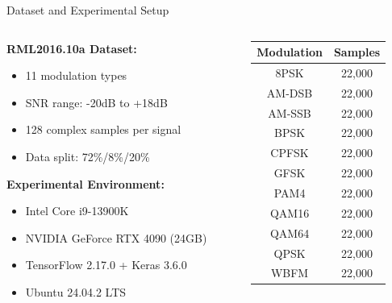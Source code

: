 \documentclass[aspectratio=169]{beamer}
\begin{document}
\begin{frame}{Dataset and Experimental Setup}
\begin{columns}
\begin{column}{0.6\textwidth}
\textbf{RML2016.10a Dataset:}
\begin{itemize}
\item 11 modulation types
\item SNR range: -20dB to +18dB
\item 128 complex samples per signal
\item Data split: 72\%/8\%/20\%
\end{itemize}

\textbf{Experimental Environment:}
\begin{itemize}
\item Intel Core i9-13900K
\item NVIDIA GeForce RTX 4090 (24GB)
\item TensorFlow 2.17.0 + Keras 3.6.0
\item Ubuntu 24.04.2 LTS
\end{itemize}
\end{column}
\begin{column}{0.4\textwidth}
\begin{table}[h]
\centering
\scriptsize
\begin{tabular}{@{}cc@{}}
\toprule
Modulation & Samples \\
\midrule
8PSK & 22,000 \\
AM-DSB & 22,000 \\
AM-SSB & 22,000 \\
BPSK & 22,000 \\
CPFSK & 22,000 \\
GFSK & 22,000 \\
PAM4 & 22,000 \\
QAM16 & 22,000 \\
QAM64 & 22,000 \\
QPSK & 22,000 \\
WBFM & 22,000 \\
\bottomrule
\end{tabular}
\end{table}
\end{column}
\end{columns}
\end{frame}
\end{document}
